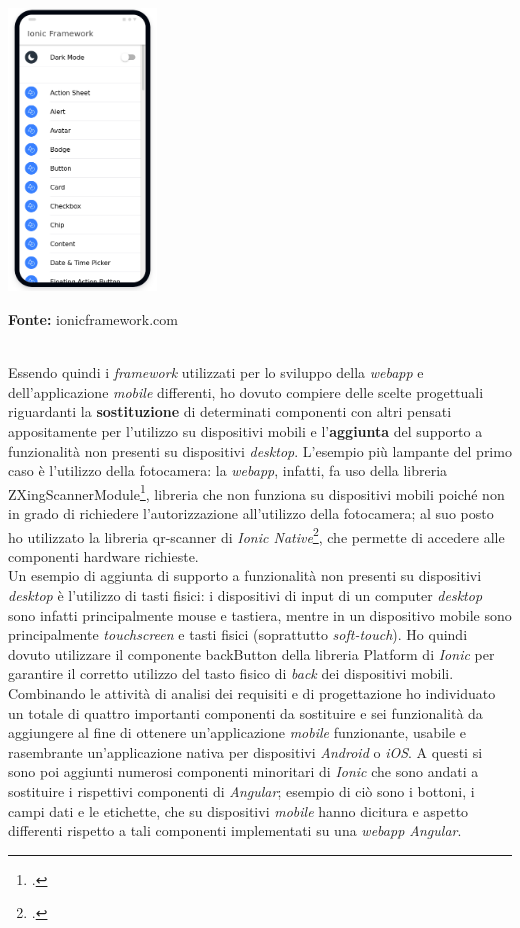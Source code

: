 \begin{minipage}{\linewidth}
  \label{img:ioniclib}
  \centering
    \includegraphics[height=7.5cm]{immagini/ioniclib}
  \caption*{\textbf{Fonte:} ionicframework.com}
\end{minipage} \\

Essendo quindi i \textit{framework} utilizzati per lo sviluppo della \textit{webapp} e dell'applicazione \textit{mobile} differenti, ho dovuto compiere delle scelte progettuali riguardanti la \textbf{sostituzione} di determinati componenti con altri pensati appositamente per l'utilizzo su dispositivi mobili e l'\textbf{aggiunta} del supporto a funzionalità non presenti su dispositivi \textit{desktop}. L'esempio più lampante del primo caso è l'utilizzo della fotocamera: la \textit{webapp}, infatti, fa uso della libreria ZXingScannerModule\footcite{tec:zxingscannermodule}, libreria che non funziona su dispositivi mobili poiché non in grado di richiedere l'autorizzazione all'utilizzo della fotocamera; al suo posto ho utilizzato la libreria qr-scanner di \textit{Ionic Native}\footcite{tec:ionicnative}, che permette di accedere alle componenti hardware richieste. \\
Un esempio di aggiunta di supporto a funzionalità non presenti su dispositivi \textit{desktop} è l'utilizzo di tasti fisici: i dispositivi di input di un computer \textit{desktop} sono infatti principalmente mouse e tastiera, mentre in un dispositivo mobile sono principalmente \textit{touchscreen} e tasti fisici (soprattutto \textit{soft-touch}). Ho quindi dovuto utilizzare il componente backButton della libreria Platform di \textit{Ionic} per garantire il corretto utilizzo del tasto fisico di \textit{back} dei dispositivi mobili. \\
Combinando le attività di analisi dei requisiti e di progettazione ho individuato un totale di quattro importanti componenti da sostituire e sei funzionalità da aggiungere al fine di ottenere un'applicazione \textit{mobile} funzionante, usabile e rasembrante un'applicazione nativa per dispositivi \textit{Android} o \textit{iOS}. A questi si sono poi aggiunti numerosi componenti minoritari di \textit{Ionic} che sono andati a sostituire i rispettivi componenti di \textit{Angular}; esempio di ciò sono i bottoni, i campi dati e le etichette, che su dispositivi \textit{mobile} hanno dicitura e aspetto differenti rispetto a tali componenti implementati su una \textit{webapp Angular}.

